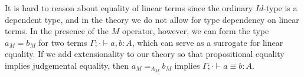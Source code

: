 It is hard to reason about equality of linear terms since the ordinary $Id$-type is a dependent type, and in the theory we do not allow for type dependency on linear terms. In the presence of the $M$ operator, however, we can form the type $a_M = b_M$ for two terms $\Gamma; \cdot \vdash a, b : A$, which can serve as a surrogate for linear equality. If we add extensionality to our theory so that propositional equality implies judgemental equality, then $a_M =_{A_M} b_M$ implies $\Gamma; \cdot \vdash a \equiv b : A$.\\
\begin{comment}
A natural question to ask would be the following:
Does $a_M =_{A_M} b_M$ imply that for all $\Gamma; \cdot \vdash f : A \multimap C$, we have $\Gamma \vdash (f(a))_M =_C f(b)_M$? Yes it should.

This only allows us to compare linear terms in an empty linear context, however. When we want to compare two general terms $\Gamma; x_1 : A_1, x_2 : A_2, \dots x_n : A_n \vdash f : B$ and $\Gamma; x_1 : A_1, x_2 : A_2, \dots x_n : A_n \vdash g : B$, the type
\[
  \Gamma, y_1 : {A_1}_M, y_2 : {A_2}_M, \dots y_n : {A_n}_M \vdash f[\sigma(\bar y)/\bar x]_M =_{B_M} g[\sigma(\hat y)/\hat x]_M
\]
but this gives us very little information about $f$ and $g$, since we have no way of ``going back'' to the mixed linear context. This is related to the fact that generally, there is no inverse to the map $\texttt{fmap} : (A \multimap B)_M \to (A_M \to B_M)$. We can postulating the existence of such a map by the rules:
\[
  \inference{
    \Gamma \vdash A \linear\\
    \Gamma \vdash B \linear
  }
  {
    \Gamma \vdash \texttt{fmap}^{-1} : (A_M \to B_M) \to (A \multimap B)_M
  }[$\texttt{fmap}^{-1}$-I]
\]
\[
  \inference{\Gamma \vdash f : (A \multimap B)_M}
  {\Gamma \vdash \texttt{fmap}^{-1}(\texttt{fmap}(f)) \equiv f : (A \multimap B)_M}[$\texttt{fmap}$-l]
\]
\[
  \inference{\Gamma \vdash f : A_M \to B_M}
  {\Gamma \vdash \texttt{fmap}(\texttt{fmap}^{-1}(f)) \equiv f : A_M \to B_M}[$\texttt{fmap}$-r]
\]
which corresponds to asking for $M$ to be a strong closed functor in the semantics.
\end{comment}
